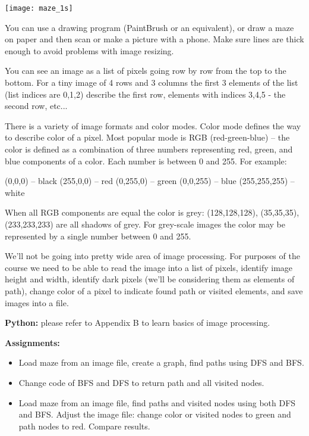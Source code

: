 \texttt{[image: maze\_1s]}

You can use a drawing program (PaintBrush or an equivalent),
or draw a maze on paper and then scan or make a picture with
a phone. Make sure lines are thick enough to avoid problems
with image resizing.

You can see an image as a list of pixels going row by row
from the top to the bottom. For a tiny image of 4 rows and
3 columns the first 3 elements of the list (list indices are 0,1,2)
describe the first row, elements with indices 3,4,5 - the second row, etc...

There is a variety of image formats and color modes. Color mode
defines the way to describe color of a pixel. Most popular mode
is RGB (red-green-blue) -- the color is defined as a combination
of three numbers representing red, green, and blue components
of a color. Each number is between 0 and 255. For example:

(0,0,0) -- black
(255,0,0) -- red
(0,255,0) -- green
(0,0,255) -- blue
(255,255,255) -- white

When all RGB components are equal the color is grey: (128,128,128),
(35,35,35), (233,233,233) are all shadows of grey. For
grey-scale images the color may be represented by a single number
between 0 and 255.

We'll not be going into pretty wide area of image processing.
For purposes of the course we need to be able to read the image
into a list of pixels, identify image height and width, 
identify dark pixels
(we'll be considering them as elements of path), change color
of a pixel to indicate found path or visited elements, and save
images into a file.

\begin{tcolorbox}
\textbf{Python:} please refer to Appendix B to learn
basics of image processing.
\end{tcolorbox}

\begin{tcolorbox}
\textbf{Assignments:}
\begin{itemize}
\item Load maze from an image file, create a graph, find paths
using DFS and BFS.
\item Change code of BFS and DFS to return path and all visited
nodes.
\item Load maze from an image file, find paths and visited nodes
using both DFS and BFS. Adjust the image file: change color
or visited nodes to green and path nodes to red. Compare results.
\end{itemize}
\end{tcolorbox}

